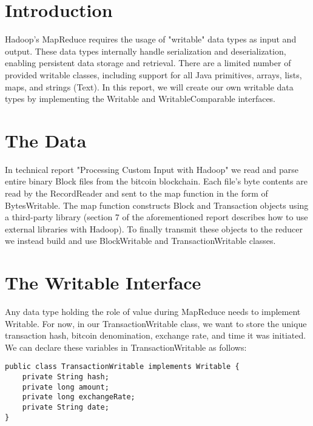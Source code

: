 \documentclass[9pt,twocolumn,twoside]{idsi}
\begin{document}
\makecoverpage

\maketitle

\section{Introduction}

Hadoop's MapReduce requires the usage of "writable" data types as input and output. These data types internally handle serialization and deserialization, enabling persistent data storage and retrieval. There are a limited number of provided writable classes, including support for all Java primitives, arrays, lists, maps, and strings (Text). In this report, we will create our own writable data types by implementing the Writable and WritableComparable interfaces.

\section{The Data}

In technical report "Processing Custom Input with Hadoop" we read and parse entire binary Block files from the bitcoin blockchain. Each file's byte contents are read by the RecordReader and sent to the map function in the form of BytesWritable. The map function constructs Block and Transaction objects using a third-party library (section 7 of the aforementioned report describes how to use external libraries with Hadoop). To finally transmit these objects to the reducer we instead build and use BlockWritable and TransactionWritable classes.

\section{The Writable Interface}

Any data type holding the role of value during MapReduce needs to implement Writable. For now, in our TransactionWritable class, we want to store the unique transaction hash, bitcoin denomination, exchange rate, and time it was initiated. We can declare these variables in TransactionWritable as follows:

\begin{lstlisting}
public class TransactionWritable implements Writable {
    private String hash;
    private long amount;
    private long exchangeRate;
    private String date;
}
\end{lstlisting}
\end{document}
